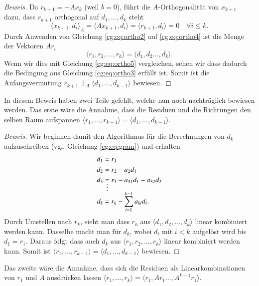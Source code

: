 \begin{proof}[Beweis]
Da $r_{k+1} = -Ax_k$ (weil $b=0$), führt die $A$-Orthogonalität von $x_{k+1}$ dazu, dass $r_{k+1}$ orthogonal auf $d_1, \dots, d_k$ steht
\begin{equation}\label{cg:eq:ortho5}
	\langle x_{k+1}, d_i \rangle_A = \langle Ax_{k+1}, d_i \rangle = \langle r_{k+1}, d_i \rangle = 0 \quad \forall i \le k.
\end{equation}
Durch Anwenden von Gleichung \eqref{cg:eq:ortho2} auf \eqref{cg:eq:ortho4} ist die Menge der Vektoren $Ar_i$
\begin{equation}
	\langle r_1, r_2, \dots , r_k \rangle = \langle d_1, d_2 \dots ,d_k \rangle.
\end{equation} 
Wenn wir dies mit Gleichung \eqref{cg:eq:ortho5} vergleichen, sehen wir dass dadurch die Bedingung aus Gleichung \eqref{cg:eq:ortho3} erfüllt ist.
Somit ist die Anfangsvermutung $r_{k+1} \perp_A \langle d_1, \dots ,d_{k-1} \rangle$ bewiesen.
\end{proof}

In diesem Beweis haben zwei Teile gefehlt, welche nun noch nachträglich bewiesen werden.
Das erste wäre die Annahme, dass die Residuen und die Richtungen den selben Raum aufspannen $\langle r_1, \dots ,r_{k-1} \rangle = \langle d_1, \dots ,d_{k-1} \rangle$.

\begin{proof}[Beweis]
Wir beginnen damit den Algorithmus für die Berechnungen von $d_k$ aufzuschreiben (vgl. Gleichung \eqref{cg:eq:gram}) und erhalten
\begin{align}
	d_1 &= r_1 \nonumber\\
	d_2	&= r_2 - a_2 d_1\nonumber\\
	d_3	&= r_3 - a_{31} d_1 - a_{32} d_2\nonumber\\
	&\shortvdotswithin{=} \nonumber
	d_k &= r_k - \sum_{i=1}^{k-1} a_{ki} d_i.
\end{align}
Durch Umstellen nach $r_k$, sieht man dass $r_k$ aus $\langle d_1, d_2, \dots, d_k \rangle$ linear kombiniert werden kann.
Dasselbe macht man für $d_k$, wobei $d_i$ mit $i<k$ aufgelöst wird bis $d_1 = r_1$.
Daraus folgt dass auch $d_k$ aus $\langle r_1, r_2, \dots, r_k \rangle$ linear kombiniert werden kann.
Somit ist $\langle r_1, \dots ,r_{k-1} \rangle = \langle d_1, \dots ,d_{k-1} \rangle$ bewiesen.
\end{proof}

Das zweite wäre die Annahme, dass sich die Residuen als Linearkombinationen von $r_1$ und $A$ ausdrücken lassen $\langle r_1, \dots ,r_k \rangle = \langle r_1, Ar_1 \dots ,A^{k-1}r_1 \rangle$.

